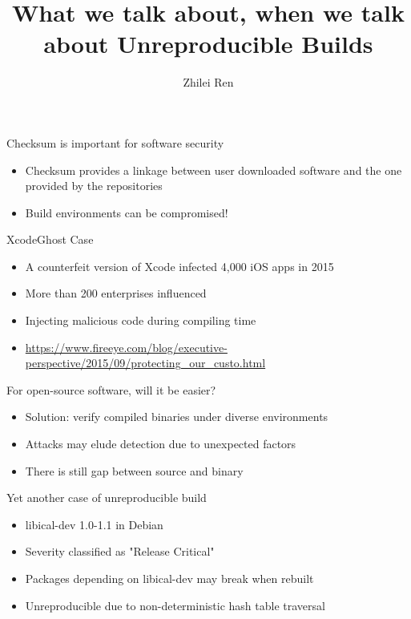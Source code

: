 \documentclass{beamer}
\title{What we talk about, when we talk about Unreproducible Builds}
\author{Zhilei Ren}
\institute{zren@dlut.edu.cn \\ http://zhilei.ren}
\date{}
\begin{document}
\begin{frame}
\titlepage
\end{frame}

\begin{frame}{Checksum is important for software security}
\begin{itemize}
\item Checksum provides a linkage between user downloaded software and the one provided by the repositories
\item Build environments can be compromised!
\end{itemize}
\end{frame}

\begin{frame}{XcodeGhost Case}
\begin{itemize}
\item A counterfeit version of Xcode infected 4,000 iOS apps in 2015
\item More than 200 enterprises influenced
\item Injecting malicious code during compiling time
\item \url{https://www.fireeye.com/blog/executive-perspective/2015/09/protecting_our_custo.html}
\end{itemize}
\end{frame}

\begin{frame}{For open-source software, will it be easier?}
\begin{itemize}
\item Solution: verify compiled binaries under diverse environments
\item Attacks may elude detection due to unexpected factors
\item There is still gap between source and binary
\end{itemize}
\end{frame}

\begin{frame}{Yet another case of unreproducible build}
\begin{itemize}
\item libical-dev 1.0-1.1 in Debian
\item Severity classified as "Release Critical"
\item Packages depending on libical-dev may break when rebuilt
\item Unreproducible due to non-deterministic hash table traversal
\end{itemize}
\end{frame}
\end{document}
